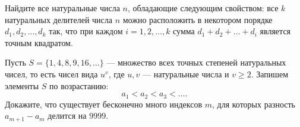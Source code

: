 \medskip

Найдите все натуральные числа $n$, обладающие следующим свойством: все $k$ натуральных делителей числа $n$ можно расположить в некотором порядке $d_1,d_2,\dots,d_k$ так, что при каждом $i=1,2,\dots,k$ сумма $d_1+d_2+\dots+d_i$ является точным квадратом.

\medskip

Пусть $S=\{1,4,8,9,16,\dots\}$ --- множество всех точных степеней натуральных чисел, то есть чисел вида $u^v$, где $u,v$ --- натуральные числа и $v\geq2$. Запишем элементы $S$ по возрастанию:
\[
  a_1<a_2<a_3<\dots.
\]
Докажите, что существует бесконечно много индексов $m$, для которых разность $a_{m+1}-a_m$ делится на $9999$.
